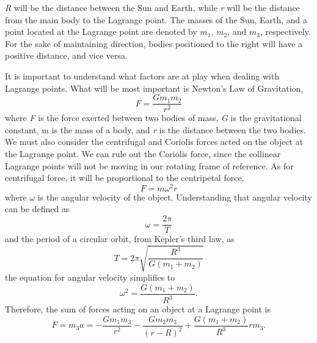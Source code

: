 \documentclass[12pt]{article}
\begin{document}
	\textit{R} will be the distance between the Sun and Earth, while \textit{r} will be the distance from the main body to the Lagrange point. 
	The masses of the Sun, Earth, and a point located at the Lagrange point are denoted by $m_1$, $m_2$, and $m_3$, respectively.
	For the sake of maintaining direction, bodies positioned to the right will have a positive distance, and vice versa.

	It is important to understand what factors are at play when dealing with Lagrange points.
	What will be most important is Newton's Law of Gravitation,
	\begin{equation}
		F = \frac{Gm_1m_2}{r^2}
	\end{equation}
	where \textit{F} is the force exerted between two bodies of mass, \textit{G} is the gravitational constant, m is the mass of a body, and \textit{r} is the distance between the two bodies.
	We must also consider the centrifugal and Coriolis forces acted on the object at the Lagrange point.
	We can rule out the Coriolis force, since the collinear Lagrange points will not be moving in our rotating frame of reference.
	As for centrifugal force, it will be proportional to the centripetal force,
	\begin{equation}
		F = m\omega^2r
	\end{equation}
	where $\omega$ is the angular velocity of the object. Understanding that angular velocity can be defined as
	\begin{equation}
		\omega = \frac{2\pi}{T}
	\end{equation}
	and the period of a circular orbit, from Kepler's third law, as
	\begin{equation}
		T = 2\pi\sqrt{\frac{R^3}{G(m_1+m_2)}} %
	\end{equation}
 	the equation for angular velocity simplifies to
 	\begin{equation}
 		\omega^2 = \frac{G(m_1+m_2)}{R^3} \text{.} %
 	\end{equation} %
	Therefore, the sum of forces acting on an object at a Lagrange point is
	\begin{equation}
		F = m_3a = -\frac{Gm_1m_3}{r^2} - \frac{Gm_2m_3}{(r - R)^2} + \frac{G(m_1+m_2)}{R^3}rm_3 \text{.}
	\end{equation}
\end{document}
